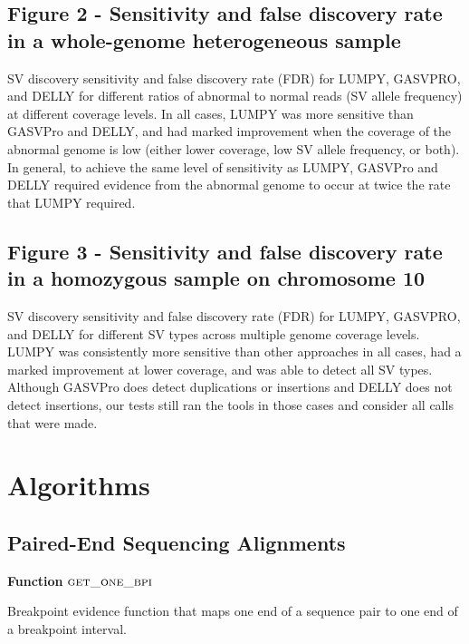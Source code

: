 \documentclass[10pt]{bmc_article}
\def\texttt{[image: ]}
\newenvironment{bmcformat}{\begin{raggedright}\baselineskip20pt\sloppy\setboolean{publ}{false}}{\end{raggedright}\baselineskip20pt\sloppy}
\begin{document}
\begin{bmcformat}
\subsection*{Figure 2 - Sensitivity and false discovery rate in a whole-genome
heterogeneous sample}
SV discovery sensitivity and false discovery rate (FDR) for LUMPY, GASVPRO, and
DELLY for different ratios of abnormal to normal reads (SV allele frequency) at
different coverage levels.  In all cases, LUMPY was more sensitive than GASVPro
and DELLY, and had marked improvement when the coverage of the abnormal
genome is low (either lower coverage, low SV allele frequency, or both).  In
general, to achieve the same level of sensitivity as LUMPY, GASVPro and DELLY
required evidence from the abnormal genome to occur at twice the rate that LUMPY
required. 


\subsection*{Figure 3 - Sensitivity and false discovery rate in a homozygous
sample on chromosome 10}
SV discovery sensitivity and false discovery rate (FDR) for LUMPY, GASVPRO, and
DELLY for different SV types across multiple genome coverage levels.  LUMPY was
consistently more sensitive than other approaches in all cases, had a marked
improvement at lower coverage, and was able to detect all SV types.  Although
GASVPro does detect duplications or insertions and DELLY does not detect
insertions, our tests still ran the tools in those cases and consider all calls
that were made.


\section*{Algorithms}

\subsection*{Paired-End Sequencing Alignments}
\label{pe:sec}
\begin{algorithm}[H]
    \DontPrintSemicolon
    \footnotesize
    \BlankLine
    \textbf{Function} $\textsc{get\_one\_bpi}$\;
	\caption{Breakpoint evidence function that maps one end of a sequence pair
			to one end of a breakpoint interval.}
    \label{get_one_bpi}
\end{algorithm}


\end{bmcformat}
\end{document}

